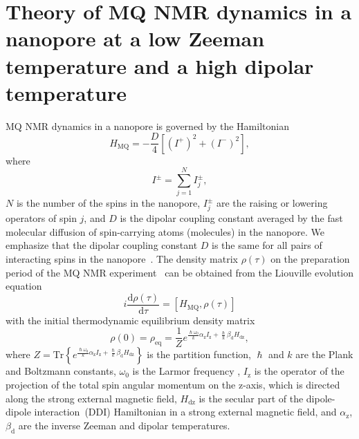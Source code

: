\section{Theory of MQ NMR dynamics in a nanopore at a low Zeeman temperature and a high dipolar temperature}
\label{sec:2}

MQ NMR dynamics in a nanopore is governed by the Hamiltonian~\cite{Doronin_2019,Doronin_2009}
%
\begin{equation}
    \label{eq:1}
    H_{\mathrm{MQ}} = - \dfrac{D}{4} \left[
        \left(I^{+}\right)^{2}
        + \left(I^{-}\right)^{2}
    \right] ,
\end{equation}
%
where
%
\begin{equation}
    \label{eq:2}
    I^{\pm} = \sum\limits_{j=1}^{N} I_{j}^{\pm},
\end{equation}
%
$N$ is the number of the spins in the nanopore, $I^{\pm}_{j}$ are the raising or lowering operators of spin $j$, and $D$ is the dipolar coupling constant averaged by the fast molecular diffusion of spin-carrying atoms (molecules) in the nanopore.
We emphasize that the dipolar coupling constant $D$ is the same for all pairs of interacting spins in the nanopore~\cite{Doronin_2019,Doronin_2009}.
The density matrix $\rho(\tau)$ on the preparation period of the MQ NMR experiment~\cite{Baum_1985} can be obtained from the Liouville evolution equation~\cite{Goldman_1970,Abragam_1982}
%
\begin{equation}
    \label{eq:3}
    i\dfrac{\mathrm{d}\rho(\tau)}{\mathrm{d}\tau} = \left[
    H_\mathrm{MQ},\rho(\tau)
    \right]
\end{equation}
%
with the initial thermodynamic equilibrium density matrix
%
\begin{equation}
    \label{eq:4}
       \rho(0) = \rho_\mathrm{eq} = \dfrac{1}{Z}
       e^{
		   \frac{\hslash \omega_{0}}{k} \alpha_\mathrm{z} I_\mathrm{z}
            + \frac{\hslash }{k} \beta_\mathrm{d} H_\mathrm{dz}
        },
\end{equation}
%
where
$Z = \mathrm{Tr} \left\{ e^{\frac{\hslash \omega_{0}}{k} \alpha_\mathrm{z} I_\mathrm{z} + \frac{\hslash  }{k} \beta_\mathrm{d} H_\mathrm{dz}} \right\}$ is the partition function,
$\hslash$ and $k$ are the Plank and Boltzmann constants,
$\omega_{0}$  is the Larmor frequency , $I_\mathrm{z}$ is the operator of the projection of the total spin angular momentum on the z-axis,
which is directed along the strong external magnetic field,
$H_\mathrm{dz}$ is the secular part of the dipole-dipole interaction~(DDI) Hamiltonian in a strong external magnetic field, and $\alpha_\mathrm{z}$, $\beta_\mathrm{d}$ are the inverse Zeeman and dipolar temperatures.
